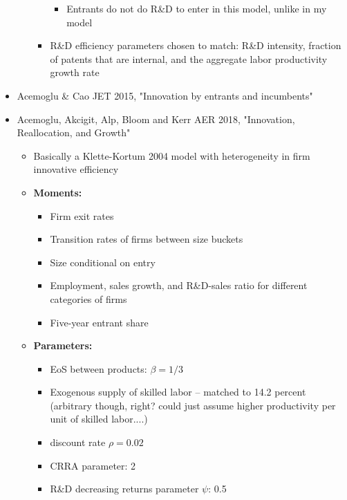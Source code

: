 \documentclass[12pt,english]{article}
\theoremstyle{remark}
\begin{document}
\begin{itemize}
\begin{itemize}
\begin{itemize}
			\begin{itemize}
				\item Entrants do not do R\&D to enter in this model, unlike in my model
			\end{itemize}
			\item R\&D efficiency parameters chosen to match: R\&D intensity, fraction of patents that are internal, and the aggregate labor productivity growth rate  
		\end{itemize}
	\end{itemize}
	\item Acemoglu \& Cao JET 2015, "Innovation by entrants and incumbents"
	\item Acemoglu, Akcigit, Alp, Bloom and Kerr AER 2018, "Innovation, Reallocation, and Growth"
	\begin{itemize}
		\item Basically a Klette-Kortum 2004 model with heterogeneity in firm innovative efficiency
		\item \textbf{Moments:}
		\begin{itemize}
			\item Firm exit rates
			\item Transition rates of firms between size buckets
			\item Size conditional on entry
			\item Employment, sales growth, and R\&D-sales ratio for different categories of firms
			\item Five-year entrant share
		\end{itemize}
		\item \textbf{Parameters:}
		\begin{itemize}
			\item EoS between products: $\beta = 1/3$
			\item Exogenous supply of skilled labor -- matched to 14.2 percent (arbitrary though, right? could just assume higher productivity per unit of skilled labor....)
			\item discount rate $\rho = 0.02$
			\item CRRA parameter: 2
			\item R\&D decreasing returns parameter $\psi$: 0.5
		\end{itemize}
	\end{itemize}
\end{itemize}
\end{document}
